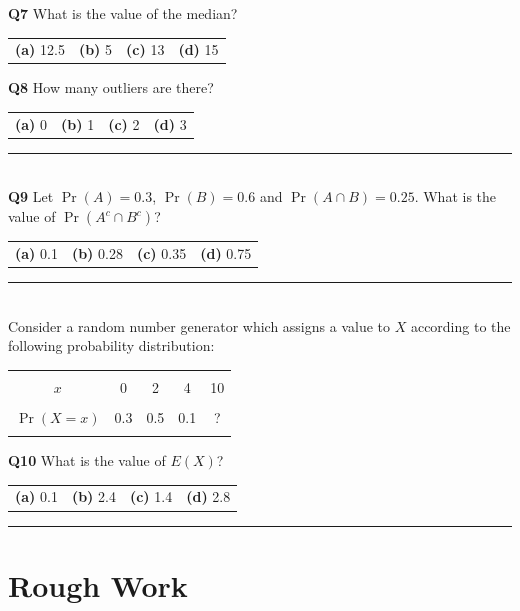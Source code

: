 \documentclass[12pt]{article}
\begin{document}
{\bf Q7} What is the value of the median?\\[0.2cm]
\begin{tabular}{cccc}
{\bf(a)} 12.5 & {\bf(b)} 5 & {\bf(c)} 13 & {\bf(d)} 15 \\[0.6cm]
\end{tabular}

{\bf Q8} How many outliers are there?\\[0.2cm]
\begin{tabular}{cccc}
{\bf(a)} 0 & {\bf(b)} 1 & {\bf(c)} 2 & {\bf(d)} 3 \\[0.6cm]
\end{tabular}

\rule{\linewidth}{1pt}
\quad\\
{\bf Q9} Let $\Pr(A) = 0.3$, $\Pr(B) = 0.6$ and $\Pr(A \cap B) = 0.25$. What is the value of $\Pr(A^c \cap B^c)$? \\[0.2cm]
\begin{tabular}{cccc}
{\bf(a)} 0.1 & {\bf(b)} 0.28 & {\bf(c)} 0.35 & {\bf(d)} 0.75 \\[0.6cm]
\end{tabular}


\rule{\linewidth}{1pt}
\quad\\
Consider a random number generator which assigns a value to $X$ according to the following probability distribution:
\begin{center}
\begin{tabular}{|c|cccc|}
\hline
&&&&\\[-0.4cm]
$x$        & 0 & 2 & 4 & 10 \\
\hline
&&&&\\[-0.4cm]
$\Pr(X=x)$ & 0.3 & 0.5 & 0.1 & ? \\
\hline
\multicolumn{5}{c}{}
\end{tabular}
\end{center}

{\bf Q10} What is the value of $E(X)$?\\[0.2cm]
\begin{tabular}{cccc}
{\bf(a)} 0.1 & {\bf(b)} 2.4 & {\bf(c)} 1.4 & {\bf(d)} 2.8 \\[0.6cm]
\end{tabular}

\rule{\linewidth}{1pt}

\newpage

\section*{Rough Work\\[23cm]}
\end{document}
